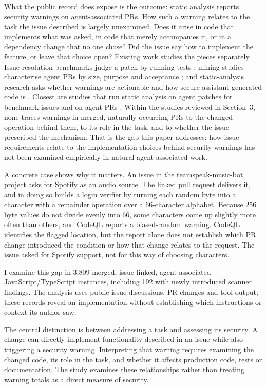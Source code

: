 \documentclass[acmsmall,screen,nonacm]{acmart}
\begin{document}
What the public record does expose is the outcome: static analysis reports security warnings on agent-associated PRs. How such a warning relates to the task the issue described is largely unexamined. Does it arise in code that implements what was asked, in code that merely accompanies it, or in a dependency change that no one chose? Did the issue say how to implement the feature, or leave that choice open? Existing work studies the pieces separately. Issue-resolution benchmarks judge a patch by running tests \cite{b9}; mining studies characterise agent PRs by size, purpose and acceptance \cite{b11,b21}; and static-analysis research asks whether warnings are actionable and how secure assistant-generated code is \cite{b32,b33,b34,b35}. Closest are studies that run static analysis on agent patches for benchmark issues \cite{b36} and on agent PRs \cite{b37}. Within the studies reviewed in Section~3, none traces warnings in merged, naturally occurring PRs to the changed operation behind them, to its role in the task, and to whether the issue prescribed the mechanism. That is the gap this paper addresses: how issue requirements relate to the implementation choices behind security warnings has not been examined empirically in natural agent-associated work.

A concrete case shows why it matters. An \href{https://github.com/ZHANGTIANYAO1/teamspeak-music-bot/issues/112}{issue} in the teamspeak-music-bot project asks for Spotify as an audio source. The linked \href{https://github.com/ZHANGTIANYAO1/teamspeak-music-bot/pull/118}{pull request} delivers it, and in doing so builds a login verifier by turning each random byte into a character with a remainder operation over a 66-character alphabet. Because 256 byte values do not divide evenly into 66, some characters come up slightly more often than others, and CodeQL reports a biased-random warning. CodeQL identifies the flagged location, but the report alone does not establish which PR change introduced the condition or how that change relates to the request. The issue asked for Spotify support, not for this way of choosing characters.

I examine this gap in 3,809 merged, issue-linked, agent-associated JavaScript/\allowbreak TypeScript instances, including 192 with newly introduced scanner findings. The analysis uses public issue discussions, PR changes and tool output; these records reveal an implementation without establishing which instructions or context its author saw.

The central distinction is between addressing a task and assessing its security. A change can directly implement functionality described in an issue while also triggering a security warning. Interpreting that warning requires examining the changed code, its role in the task, and whether it affects production code, tests or documentation. The study examines these relationships rather than treating warning totals as a direct measure of security.
\end{document}
